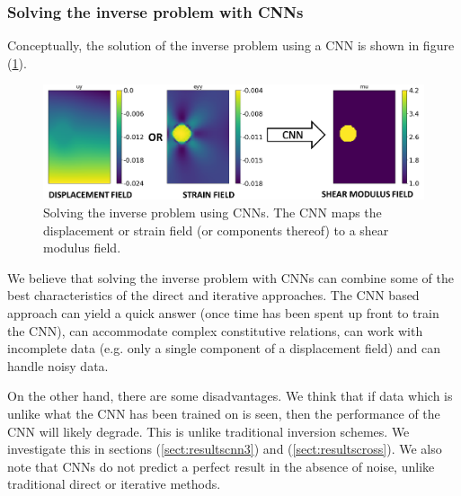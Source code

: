 \documentclass[12pt]{article}
\begin{document}
\subsubsection{Solving the inverse problem with CNNs}
Conceptually, the solution of the inverse problem using a CNN is shown in figure (\ref{fig:schematic_inv}).
%
\begin{figure}[!h]
   \centering
    \includegraphics[totalheight=4cm]{Figures/schematic_inv/schematic_inv.png}
  \caption{\label{fig:schematic_inv} Solving the inverse problem using CNNs. The CNN maps the displacement or strain field (or components thereof) to a shear modulus field.}
\end{figure}
%
We believe that solving the inverse problem with CNNs can combine some of the best characteristics of the direct and iterative approaches. The CNN based approach can yield a quick answer (once time has been spent up front to train the CNN), can accommodate complex constitutive relations, can work with incomplete data (e.g. only a single component of a displacement field) and can handle noisy data.

On the other hand, there are some disadvantages. We think that if data which is unlike what the CNN has been trained on is seen, then the performance of the CNN will likely degrade. This is unlike traditional inversion schemes. We investigate this in sections  (\ref{sect:resultscnn3}) and (\ref{sect:resultscross}). We also note that CNNs do not predict a perfect result in the absence of noise, unlike traditional direct or iterative methods.

\end{document}
